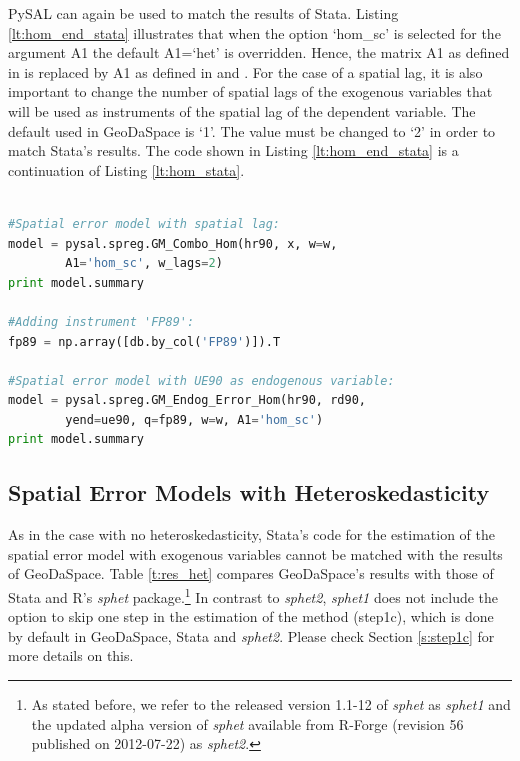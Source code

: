 \documentclass{article}
\begin{document}
PySAL can again be used to match the results of Stata. Listing \ref{lt:hom_end_stata} illustrates that when the option `hom\_sc' is selected for the argument A1 the default A1=`het' is overridden. Hence, the matrix A1 as defined in \citet{Arraiz10} is replaced by A1 as defined in \citet{Drukker10} and \citet{Drukker11}. For the case of a spatial lag, it is also important to change the number of spatial lags of the exogenous variables that will be used as instruments of the spatial lag of the dependent variable. The default used in GeoDaSpace is `1'. The value must be changed to `2' in order to match Stata's results. The code shown in Listing \ref{lt:hom_end_stata} is a continuation of Listing \ref{lt:hom_stata}.

\begin{code}
\begin{lstlisting}[label=lt:hom_end_stata,caption=Using PySAL to match the results of spatial error models with endogenous variables or spatial lag from Stata,language=Python]

#Spatial error model with spatial lag:
model = pysal.spreg.GM_Combo_Hom(hr90, x, w=w, 
        A1='hom_sc', w_lags=2)
print model.summary

#Adding instrument 'FP89':
fp89 = np.array([db.by_col('FP89')]).T

#Spatial error model with UE90 as endogenous variable:
model = pysal.spreg.GM_Endog_Error_Hom(hr90, rd90,
        yend=ue90, q=fp89, w=w, A1='hom_sc')
print model.summary

\end{lstlisting}
\end{code}

\subsection{Spatial Error Models with Heteroskedasticity}

As in the case with no heteroskedasticity, Stata's code for the estimation of the spatial error model with exogenous variables cannot be matched with the results of GeoDaSpace. Table \ref{t:res_het} compares GeoDaSpace's results with those of Stata and R's \emph{sphet} package.\footnote{As stated before, we refer to the released version 1.1-12 of \emph{sphet} as \emph{sphet1} and the updated alpha version of \emph{sphet} available from R-Forge (revision 56 published on 2012-07-22) as \emph{sphet2}.} In contrast to \emph{sphet2}, \emph{sphet1} does not include the option to skip one step in the estimation of the method (step1c), which is done by default in GeoDaSpace, Stata and \emph{sphet2}. Please check Section \ref{s:step1c} for more details on this.
\end{document}
